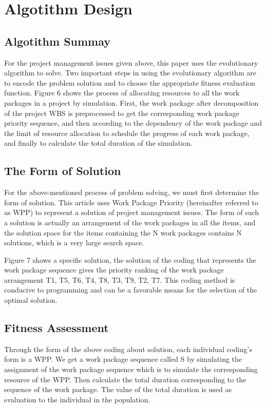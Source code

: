 \section{Algotithm Design}
\subsection{Algotithm Summay}
%

For the project management issues given above, this paper uses the 
evolutionary algorithm to solve. Two important steps in using the 
evolutionary algorithm are to encode the problem solution and to choose the 
appropriate fitness evaluation function. Figure 6 shows the process of 
allocating resources to all the work packages in a project by simulation. 
First, the work package after decomposition of the project WBS is 
preprocessed to get the corresponding work package priority sequence, and 
then according to the dependency of the work package and the limit of 
resource allocation to schedule the progress of each work package, and 
finally to calculate the total duration of the simulation.
\subsection{The Form of Solution}
%

For the above-mentioned process of problem solving, we must first determine 
the form of solution. This article uses Work Package Priority (hereinafter 
referred to as WPP) to represent a solution of project management issues. The 
form of such a solution is actually an arrangement of the work packages in 
all the items, and the solution space for the items containing the N work 
packages contains N solutions, which is a very large search space.

Figure 7 shows a specific solution, the solution of the coding that 
represents the work package sequence gives the priority ranking of the work 
package arrangement T1, T5, T6, T4, T8, T3, T9, T2, T7. This coding method is 
conducive to programming and can be a favorable means for the selection of 
the optimal solution.
\subsection{Fitness Assessment}
%

Through the form of the above coding about solution, each individual coding’s 
form is a WPP. We get a work package sequence called S by simulating the 
assignment of the work package sequence which is to simulate the 
corresponding resource of the WPP. Then calculate the total duration 
corresponding to the sequence of the work package. The value of the total 
duration is used as evaluation to the individual in the population.

